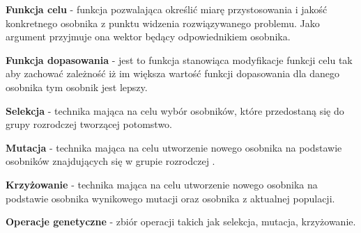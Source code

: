 \textbf{Funkcja celu} - funkcja pozwalająca określić miarę przystosowania i jakość konkretnego osobnika z punktu widzenia rozwiązywanego problemu. Jako argument przyjmuje ona wektor będący odpowiednikiem osobnika.

\textbf{Funkcja dopasowania} - jest to funkcja stanowiąca modyfikacje funkcji celu tak aby zachować zależność iż im większa wartość funkcji dopasowania dla danego osobnika tym osobnik jest lepszy.

\textbf{Selekcja} - technika mająca na celu wybór osobników, które przedostaną się do grupy rozrodczej tworzącej potomstwo.

\textbf{Mutacja} - technika mająca na celu utworzenie nowego osobnika na podstawie osobników znajdujących się w grupie rozrodczej .

\textbf{Krzyżowanie} - technika mająca na celu utworzenie nowego osobnika na podstawie osobnika wynikowego mutacji oraz osobnika z aktualnej populacji.

\textbf{Operacje genetyczne} - zbiór operacji takich jak selekcja, mutacja, krzyżowanie.

